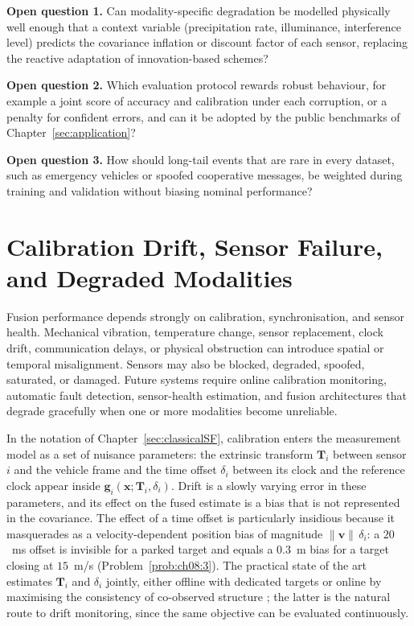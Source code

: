 \begin{list4a}
    \item \textbf{Open question 1.} Can modality-specific degradation be modelled physically well enough that a context variable (precipitation rate, illuminance, interference level) predicts the covariance inflation or discount factor of each sensor, replacing the reactive adaptation of innovation-based schemes?
    \item \textbf{Open question 2.} Which evaluation protocol rewards robust behaviour, for example a joint score of accuracy and calibration under each corruption, or a penalty for confident errors, and can it be adopted by the public benchmarks of Chapter~\ref{sec:application}?
    \item \textbf{Open question 3.} How should long-tail events that are rare in every dataset, such as emergency vehicles or spoofed cooperative messages, be weighted during training and validation without biasing nominal performance?
\end{list4a}

\section{Calibration Drift, Sensor Failure, and Degraded Modalities}
\label{subsec:oc-calibration}

Fusion performance depends strongly on calibration, synchronisation, and sensor health. Mechanical vibration, temperature change, sensor replacement, clock drift, communication delays, or physical obstruction can introduce spatial or temporal misalignment. Sensors may also be blocked, degraded, spoofed, saturated, or damaged. Future systems require online calibration monitoring, automatic fault detection, sensor-health estimation, and fusion architectures that degrade gracefully when one or more modalities become unreliable.

In the notation of Chapter~\ref{sec:classicalSF}, calibration enters the measurement model as a set of nuisance parameters: the extrinsic transform $\mathbf{T}_i$ between sensor $i$ and the vehicle frame and the time offset $\delta_i$ between its clock and the reference clock appear inside $\mathbf{g}_i(\mathbf{x};\mathbf{T}_i,\delta_i)$. Drift is a slowly varying error in these parameters, and its effect on the fused estimate is a bias that is not represented in the covariance. The effect of a time offset is particularly insidious because it masquerades as a velocity-dependent position bias of magnitude $\lVert\mathbf{v}\rVert\,\delta_i$: a $20$~ms offset is invisible for a parked target and equals a $0.3$~m bias for a target closing at $15$~m/s (Problem~\ref{prob:ch08:3}). The practical state of the art estimates $\mathbf{T}_i$ and $\delta_i$ jointly, either offline with dedicated targets \cite{furgale2013_kalibr} or online by maximising the consistency of co-observed structure \cite{levinson2013_online_calibration}; the latter is the natural route to drift monitoring, since the same objective can be evaluated continuously.

